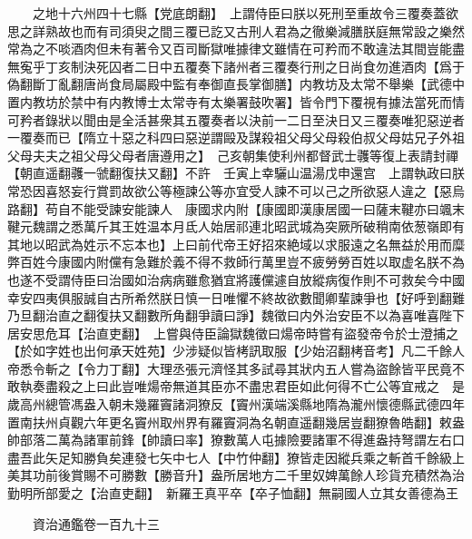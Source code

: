 　　之地十六州四十七縣【党底朗翻】　上謂侍臣曰朕以死刑至重故令三覆奏蓋欲思之詳熟故也而有司須臾之間三覆已訖又古刑人君為之徹樂減膳朕庭無常設之樂然常為之不啖酒肉但未有著令又百司斷獄唯據律文雖情在可矜而不敢違法其間豈能盡無寃乎丁亥制決死囚者二日中五覆奏下諸州者三覆奏行刑之日尚食勿進酒肉【爲于偽翻斷丁亂翻唐尚食局屬殿中監有奉御直長掌御膳】内教坊及太常不舉樂【武德中置内教坊於禁中有内教博士太常寺有太樂署鼓吹署】皆令門下覆視有據法當死而情可矜者錄狀以聞由是全活甚衆其五覆奏者以決前一二日至決日又三覆奏唯犯惡逆者一覆奏而已【隋立十惡之科四曰惡逆謂毆及謀殺祖父母父母殺伯叔父母姑兄子外祖父母夫夫之祖父母父母者唐遵用之】　己亥朝集使利州都督武士彠等復上表請封禪【朝直遥翻彠一虢翻復扶又翻】不許　壬寅上幸驪山温湯戊申還宫　上謂執政曰朕常恐因喜怒妄行賞罰故欲公等極諫公等亦宜受人諫不可以己之所欲惡人違之【惡烏路翻】苟自不能受諫安能諫人　康國求内附【康國即漢康居國一曰薩末鞬亦曰颯末鞬元魏謂之悉萬斤其王姓温本月氐人始居祁連北昭武城為突厥所破稍南依葱嶺即有其地以昭武為姓示不忘本也】上曰前代帝王好招來絶域以求服遠之名無益於用而糜弊百姓今康國内附儻有急難於義不得不救師行萬里豈不疲勞勞百姓以取虚名朕不為也遂不受謂侍臣曰治國如治病病雖愈猶宜將護儻遽自放縱病復作則不可救矣今中國幸安四夷俱服誠自古所希然朕日慎一日唯懼不終故欲數聞卿輩諫爭也【好呼到翻難乃旦翻治直之翻復扶又翻數所角翻爭讀曰諍】魏徵曰内外治安臣不以為喜唯喜陛下居安思危耳【治直吏翻】　上嘗與侍臣論獄魏徵曰煬帝時嘗有盜發帝令於士澄捕之【於如字姓也出何承天姓苑】少涉疑似皆栲訊取服【少始沼翻栲音考】凡二千餘人帝悉令斬之【令力丁翻】大理丞張元濟怪其多試尋其狀内五人嘗為盜餘皆平民竟不敢執奏盡殺之上曰此豈唯煬帝無道其臣亦不盡忠君臣如此何得不亡公等宜戒之　是歲高州總管馮盎入朝未幾羅竇諸洞獠反【竇州漢端溪縣地隋為瀧州懷德縣武德四年置南扶州貞觀六年更名竇州取州界有羅竇洞為名朝直遥翻幾居豈翻獠魯皓翻】敕盎帥部落二萬為諸軍前鋒【帥讀曰率】獠數萬人屯據險要諸軍不得進盎持弩謂左右口盡吾此矢足知勝負矣連發七矢中七人【中竹仲翻】獠皆走因縱兵乘之斬首千餘級上美其功前後賞賜不可勝數【勝音升】盎所居地方二千里奴婢萬餘人珍貨充積然為治勤明所部愛之【治直吏翻】　新羅王真平卒【卒子恤翻】無嗣國人立其女善德為王

　　資治通鑑卷一百九十三


    


 


 



 

 
  







 


